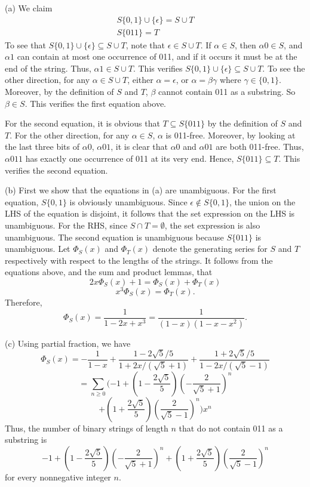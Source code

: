 \begin{enumerate}
    
    (a) We claim 
        \begin{align*}
             S\{0,1\}\cup\{\epsilon\}=S\cup T \\
             S\{011\}=T
        \end{align*}
    To see that $S\{0,1\}\cup\{\epsilon\}\subseteq S\cup T$, note that $\epsilon \in S\cup T$. If $\alpha \in S$, then $\alpha 0\in S$, and $\alpha 1$ can contain at most one occurrence of 011, and if it occurs it must be at the end of the string. Thus, $\alpha 1\in S\cup T$. This verifies $S\{0,1\}\cup\{\epsilon\}\subseteq S\cup T$. To see the other direction, for any $\alpha\in S\cup T$, either $\alpha=\epsilon$, or $\alpha=\beta\gamma$ where $\gamma\in\{0,1\}$. Moreover, by the definition of $S$ and $T$, $\beta$ cannot contain 011 as a substring. So $\beta\in S$. This verifies the first equation above.

    For the second equation, it is obvious that $T\subseteq S\{011\}$ by the definition of $S$ and $T$. For the other direction, for any $\alpha\in S$, $\alpha$ is 011-free. Moreover, by looking at the last three bits of $\alpha0$, $\alpha01$, it is clear that $\alpha0$ and $\alpha01$ are both 011-free. Thus, $\alpha011$ has exactly one occurrence of 011 at its very end. Hence, $S\{011\}\subseteq T$. This verifies the second equation. 

    (b) First we show that the equations in (a) are unambiguous. For the first equation, $S\{0,1\}$ is obviously unambiguous. Since $\epsilon \notin S\{0,1\}$, the union on the LHS of the equation is disjoint, it follows that the set expression on the LHS is unambiguous. For the RHS, since $S\cap T=\emptyset$, the set expression is also unambiguous.
    The second equation is unambiguous because $S\{011\}$ is unambiguous. Let $\Phi_S(x)$ and $\Phi_T(x)$ denote the generating series for $S$ and $T$ respectively with respect to the lengths of the strings. It follows from the equations above, and the sum and product lemmas, that $$2x\Phi_S(x)+1=\Phi_S(x)+\Phi_T(x)$$ $$x^3\Phi_S(x)=\Phi_T(x).$$
    Therefore,
    \[\Phi_S(x)=\frac{1}{1-2x+x^3}=\frac{1}{(1-x)(1-x-x^2)}.\]

    (c) Using partial fraction, we have $$\Phi_S(x)=-\frac{1}{1-x}+\frac{1-2\sqrt{5}/5}{1+2x/(\sqrt{5}+1)}+\frac{1+2\sqrt{5}/5}{1-2x/(\sqrt{5}-1)}$$ $$=\sum_{n\ge 0}(-1+(1-\frac{2\sqrt{5}}{5})(-\frac{2}{\sqrt{5}+1})^n$$ 
    $$+(1+\frac{2\sqrt{5}}{5})(\frac{2}{\sqrt{5}-1})^n) x^n$$ 
    Thus, the number of binary strings of length $n$ that do not contain 011 as a substring is \[-1+\left(1-\frac{2\sqrt{5}}{5}\right)\left(-\frac{2}{\sqrt{5}+1}\right)^n+\left(1+\frac{2\sqrt{5}}{5}\right)\left(\frac{2}{\sqrt{5}-1}\right)^n\] for every nonnegative integer $n$.   


\end{enumerate}
